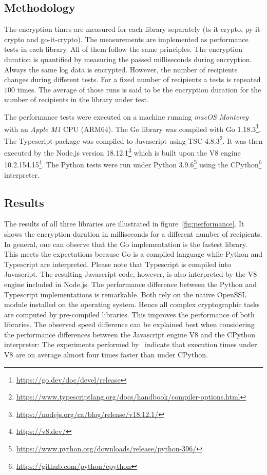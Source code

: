 \documentclass[../main.tex]{subfiles}
\begin{document}
\subsection{Methodology}
The encryption times are measured for each library separately (ts-it-crypto, py-it-crypto and go-it-crypto).
The measurements are implemented as performance tests in each library.
All of them follow the same principles.
The encryption duration is quantified by measuring the passed milliseconds during encryption.
Always the same log data is encrypted.
However, the number of recipients changes during different tests.
For a fixed number of recipients a tests is repeated $100$ times.
The average of those runs is said to be the encryption duration for the number of recipients in the library under test.

The performance tests were executed on a machine running \emph{macOS Monterey} with an \emph{Apple M1} CPU (ARM64).
The Go library was compiled with Go 1.18.3\footnote{\url{https://go.dev/doc/devel/release}}.
The Typescript package was compiled to Javascript using TSC 4.8.3\footnote{\url{https://www.typescriptlang.org/docs/handbook/compiler-options.html}}. 
It was then executed by the Node.js version 18.12.1\footnote{\url{https://nodejs.org/ca/blog/release/v18.12.1/}} which is built upon the V8 engine 10.2.154.15\footnote{\url{https://v8.dev/}}.
The Python tests were run under Python 3.9.6\footnote{\url{https://www.python.org/downloads/release/python-396/}} using the CPython\footnote{\url{https://github.com/python/cpython}} interpreter.

\subsection{Results}
The results of all three libraries are illustrated in figure~\ref{fig:performance}.
It shows the encryption duration in milliseconds for a different number of recipients.
In general, one can observe that the Go implementation is the fastest library.
This meets the expectations because Go is a compiled language while Python and Typescript are interpreted.
Please note that Typescript is compiled into Javascript.
The resulting Javascript code, however, is also interpreted by the V8 engine included in Node.js.
The performance difference between the Python and Typescript implementations is remarkable.
Both rely on the native OpenSSL module installed on the operating system.
Hence all complex cryptographic tasks are computed by pre-compiled libraries.
This improves the performance of both libraries.
The observed speed difference can be explained best when considering the performance differences between the Javascript engine V8 and the CPython interpreter:
The experiments performed by~\cite{Lion2022} indicate that execution times under V8 are on average almost four times faster than under CPython.
\end{document}
